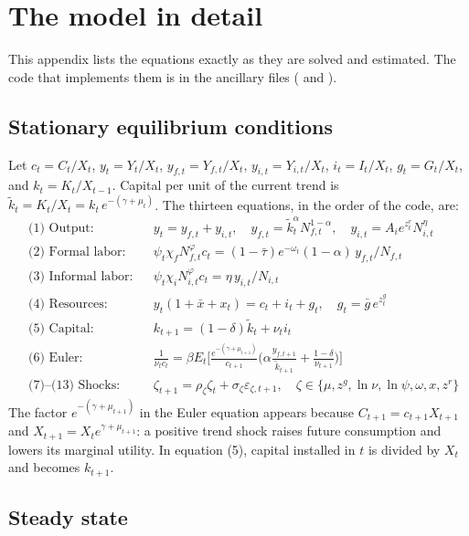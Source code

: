 \section{The model in detail}
\label{app:model}

This appendix lists the equations exactly as they are solved and estimated. The code that implements them is in the ancillary files ( and ).

\subsection{Stationary equilibrium conditions}

Let $c_t=C_t/X_t$, $y_t=Y_t/X_t$, $y_{f,t}=Y_{f,t}/X_t$, $y_{i,t}=Y_{i,t}/X_t$, $i_t=I_t/X_t$, $g_t=G_t/X_t$, and $k_t=K_t/X_{t-1}$. Capital per unit of the current trend is $\tilde k_t = K_t/X_t = k_t\,e^{-(\gamma+\mu_t)}$. The thirteen equations, in the order of the code, are:
\begin{align}
&\text{(1) Output:} && y_t = y_{f,t} + y_{i,t},\quad y_{f,t}=\tilde k_t^{\alpha}N_{f,t}^{1-\alpha},\quad y_{i,t}=A_i e^{z^r_t}N_{i,t}^{\eta} \\
&\text{(2) Formal labor:} && \psi_t\chi_fN_{f,t}^{\varphi}c_t = (1-\bar\tau)e^{-\omega_t}(1-\alpha)\,y_{f,t}/N_{f,t} \\
&\text{(3) Informal labor:} && \psi_t\chi_iN_{i,t}^{\varphi}c_t = \eta\,y_{i,t}/N_{i,t} \\
&\text{(4) Resources:} && y_t(1+\bar x + x_t) = c_t + i_t + g_t,\quad g_t=\bar g\,e^{z^g_t} \\
&\text{(5) Capital:} && k_{t+1} = (1-\delta)\tilde k_t + \nu_t i_t \\
&\text{(6) Euler:} && \frac{1}{\nu_tc_t} = \beta E_t\Big[\frac{e^{-(\gamma+\mu_{t+1})}}{c_{t+1}}\Big(\alpha\frac{y_{f,t+1}}{\tilde k_{t+1}} + \frac{1-\delta}{\nu_{t+1}}\Big)\Big] \\
&\text{(7)--(13) Shocks:} && \zeta_{t+1}=\rho_\zeta\zeta_t+\sigma_\zeta\varepsilon_{\zeta,t+1},\quad \zeta\in\{\mu, z^g,\ln\nu,\ln\psi,\omega,x,z^r\}
\end{align}
The factor $e^{-(\gamma+\mu_{t+1})}$ in the Euler equation appears because $C_{t+1}=c_{t+1}X_{t+1}$ and $X_{t+1}=X_te^{\gamma+\mu_{t+1}}$: a positive trend shock raises future consumption and lowers its marginal utility. In equation (5), capital installed in $t$ is divided by $X_t$ and becomes $k_{t+1}$.

\subsection{Steady state}

